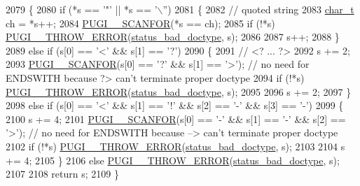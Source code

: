 \begin{DoxyCode}
2079         \{
2080             \textcolor{keywordflow}{if} (*s == \textcolor{charliteral}{'"'} || *s == \textcolor{charliteral}{'\(\backslash\)''})
2081             \{
2082                 \textcolor{comment}{// quoted string}
2083                 \hyperlink{namespacepugi_aef5a7a62cba0507542220ea15afe39df}{char\_t} ch = *s++;
2084                 \hyperlink{pugixml_8cpp_a98386e86f2c7e7e477939d209a5bbf7e}{PUGI\_\_SCANFOR}(*s == ch);
2085                 \textcolor{keywordflow}{if} (!*s) \hyperlink{pugixml_8cpp_a8af02d87a10272f03f96ab93a96d7202}{PUGI\_\_THROW\_ERROR}(\hyperlink{namespacepugi_a9054ca609e12afb8f3e5892fc6c0b555a58d1b0d8787e97fc1b5b31ec5e4fabcf}{status\_bad\_doctype}, s);
2086 
2087                 s++;
2088             \}
2089             \textcolor{keywordflow}{else} \textcolor{keywordflow}{if} (s[0] == \textcolor{charliteral}{'<'} && s[1] == \textcolor{charliteral}{'?'})
2090             \{
2091                 \textcolor{comment}{// <? ... ?>}
2092                 s += 2;
2093                 \hyperlink{pugixml_8cpp_a98386e86f2c7e7e477939d209a5bbf7e}{PUGI\_\_SCANFOR}(s[0] == \textcolor{charliteral}{'?'} && s[1] == \textcolor{charliteral}{'>'}); \textcolor{comment}{// no need for ENDSWITH because ?>
       can't terminate proper doctype}
2094                 \textcolor{keywordflow}{if} (!*s) \hyperlink{pugixml_8cpp_a8af02d87a10272f03f96ab93a96d7202}{PUGI\_\_THROW\_ERROR}(\hyperlink{namespacepugi_a9054ca609e12afb8f3e5892fc6c0b555a58d1b0d8787e97fc1b5b31ec5e4fabcf}{status\_bad\_doctype}, s);
2095 
2096                 s += 2;
2097             \}
2098             \textcolor{keywordflow}{else} \textcolor{keywordflow}{if} (s[0] == \textcolor{charliteral}{'<'} && s[1] == \textcolor{charliteral}{'!'} && s[2] == \textcolor{charliteral}{'-'} && s[3] == \textcolor{charliteral}{'-'})
2099             \{
2100                 s += 4;
2101                 \hyperlink{pugixml_8cpp_a98386e86f2c7e7e477939d209a5bbf7e}{PUGI\_\_SCANFOR}(s[0] == \textcolor{charliteral}{'-'} && s[1] == \textcolor{charliteral}{'-'} && s[2] == \textcolor{charliteral}{'>'}); \textcolor{comment}{// no need for
       ENDSWITH because --> can't terminate proper doctype}
2102                 \textcolor{keywordflow}{if} (!*s) \hyperlink{pugixml_8cpp_a8af02d87a10272f03f96ab93a96d7202}{PUGI\_\_THROW\_ERROR}(\hyperlink{namespacepugi_a9054ca609e12afb8f3e5892fc6c0b555a58d1b0d8787e97fc1b5b31ec5e4fabcf}{status\_bad\_doctype}, s);
2103 
2104                 s += 4;
2105             \}
2106             \textcolor{keywordflow}{else} \hyperlink{pugixml_8cpp_a8af02d87a10272f03f96ab93a96d7202}{PUGI\_\_THROW\_ERROR}(\hyperlink{namespacepugi_a9054ca609e12afb8f3e5892fc6c0b555a58d1b0d8787e97fc1b5b31ec5e4fabcf}{status\_bad\_doctype}, s);
2107 
2108             \textcolor{keywordflow}{return} s;
2109         \}
\end{DoxyCode}
